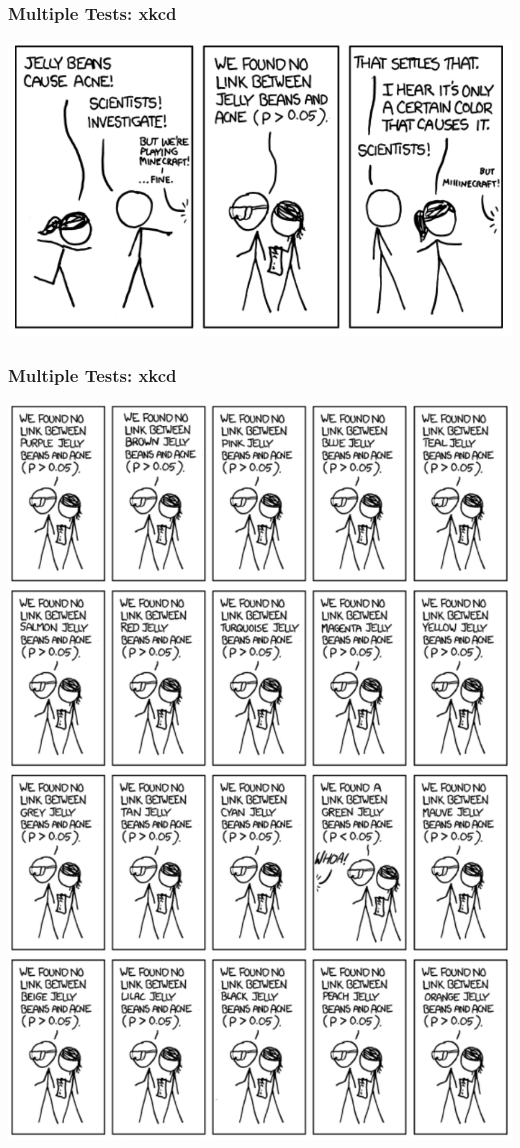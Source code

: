 \documentclass[14pt,handout]{beamer}
\begin{document}
\begin{frame}
\frametitle{Multiple Tests: xkcd}
	\begin{center}
	\includegraphics[width=1.0\textwidth]{images_20171128_xkcd_pval1.png}
	\end{center}
\end{frame}

\begin{frame}
\frametitle{Multiple Tests: xkcd}
	\begin{center}
	\includegraphics[width=.45\textwidth]{images_20171128_xkcd_pval2.png}
	\end{center}
\end{frame}
\end{document}
